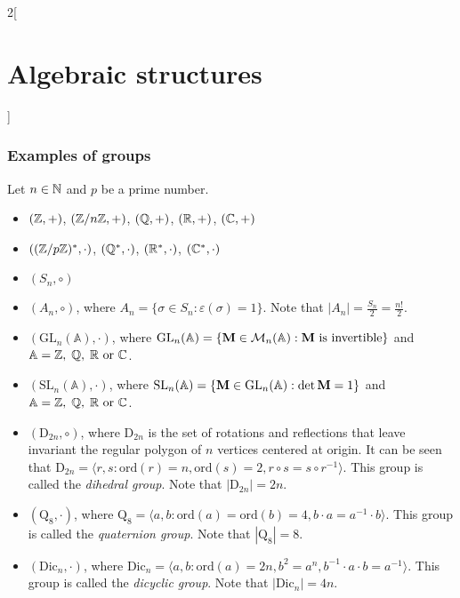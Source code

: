 \documentclass[../../../main.tex]{subfiles}
\begin{document}
\begin{multicols}{2}[\section{Algebraic structures}]
  \subsubsection{Examples of groups}\label{AS-examples}
  Let $n\in\mathbb{N}$ and $p$ be a prime number.
  \begin{itemize}
    \item $(\mathbb{Z},+)$, $(\mathbb{Z}/n\mathbb{Z},+)$, $(\mathbb{Q},+)$, $(\mathbb{R},+)$, $(\mathbb{C},+)$
    \item $((\mathbb{Z}/p\mathbb{Z})^*,\cdot)$, $(\mathbb{Q}^*,\cdot)$, $(\mathbb{R}^*,\cdot)$, $(\mathbb{C}^*,\cdot)$
    \item $(S_n,\circ)$
    \item $(A_n,\circ)$, where $A_n=\{\sigma\in S_n:\varepsilon(\sigma)=1\}$. Note that $|A_n|=\frac{S_n}{2}=\frac{n!}{2}$.
    \item $(\text{GL}_n(\mathbb{A}),\cdot)$, where $\text{GL}_n(\mathbb{A})=\{\boldsymbol{\mathrm{M}}\in\mathcal{M}_n(\mathbb{A}):\boldsymbol{\mathrm{M}}\text{ is invertible}\}$ and $\mathbb{A}=\mathbb{Z},\;\mathbb{Q},\;\mathbb{R}\text{ or }\mathbb{C}$.
    \item $(\text{SL}_n(\mathbb{A}),\cdot)$, where $\text{SL}_n(\mathbb{A})=\{\boldsymbol{\mathrm{M}}\in\text{GL}_n(\mathbb{A}):\det\boldsymbol{\mathrm{M}}=1\}$ and $\mathbb{A}=\mathbb{Z},\;\mathbb{Q},\;\mathbb{R}\text{ or }\mathbb{C}$.
    \item $(\text{D}_{2n},\circ)$, where $\text{D}_{2n}$ is the set of rotations and reflections that leave invariant the regular polygon of $n$ vertices centered at origin. It can be seen that $\text{D}_{2n}=\langle r,s:\text{ord}(r)=n,\text{ord}(s)=2,r\circ s=s\circ r^{-1}\rangle$. This group is called the \textit{dihedral group}. Note that $|\text{D}_{2n}|=2n$.
    \item $(\text{Q}_8,\cdot)$, where $\text{Q}_8=\langle a,b:\text{ord}(a)=\text{ord}(b)=4,b\cdot a=a^{-1}\cdot b\rangle$. This group is called the \textit{quaternion group}. Note that $|\text{Q}_8|=8$.
    \item $(\text{Dic}_n,\cdot)$, where $\text{Dic}_n=\langle a,b:\text{ord}(a)=2n,b^2=a^n,b^{-1}\cdot a\cdot b=a^{-1}\rangle$. This group is called the \textit{dicyclic group}. Note that $|\text{Dic}_n|=4n$.
  \end{itemize}

\end{multicols}
\end{document}
